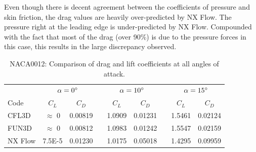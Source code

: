 Even though there is decent agreement between the coefficients of pressure and skin friction, the drag values are heavily over-predicted by NX Flow. The pressure right at the leading edge is under-predicted by NX Flow. Compounded with the fact that most of the drag (over 90\%) is due to the pressure forces in this case, this results in the large discrepancy observed.
\begin{table}
    \centering
    \caption{NACA0012: Comparison of drag and lift coefficients at all angles of attack.}
    \label{tab:naca0012}
    \begin{tabular}{@{}l cc c cc c cc@{}}
        \toprule
         & \multicolumn{2}{c}{$\alpha = 0^\circ$} & \phantom{a} 
            & \multicolumn{2}{c}{$\alpha = 10^\circ$} & \phantom{a}
            & \multicolumn{2}{c}{$\alpha = 15^\circ$}\\
        \cline{2-3} \cline{5-6} \cline{8-9}
        Code & $C_L$ & $C_D$ && $C_L$ & $C_D$ && $C_L$ & $C_D$ \\
        \midrule
        CFL3D & $\approx$ 0 & 0.00819 && 1.0909 & 0.01231 && 1.5461 & 0.02124 \\
        FUN3D & $\approx$ 0 & 0.00812 && 1.0983 & 0.01242 && 1.5547 & 0.02159 \\
        NX Flow & 7.5E-5    & 0.01230 && 1.0175 & 0.05018 && 1.4295 & 0.09959 \\
        \bottomrule
    \end{tabular}
\end{table}

